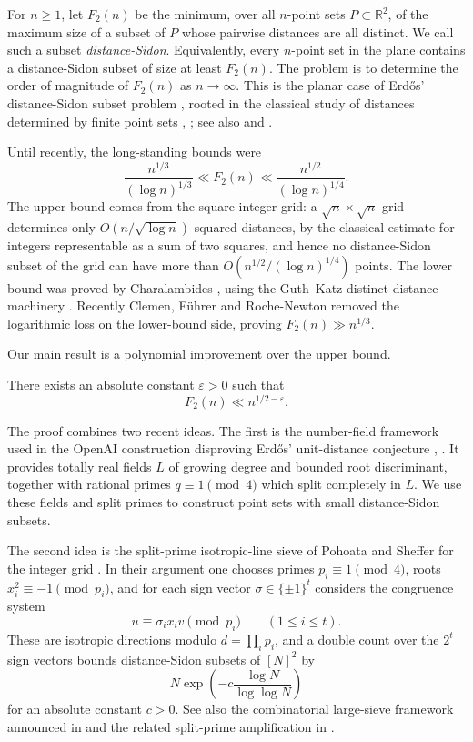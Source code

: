 For \(n\ge1\), let \(F_2(n)\) be the minimum, over all \(n\)-point sets \(P\subset\mathbb R^2\), of the maximum size of a subset of \(P\) whose pairwise distances are all distinct.
We call such a subset \emph{distance-Sidon}.
Equivalently, every \(n\)-point set in the plane contains a distance-Sidon subset of size at least \(F_2(n)\).
The problem is to determine the order of magnitude of \(F_2(n)\) as \(n\to\infty\).
This is the planar case of Erd\H{o}s' distance-Sidon subset problem \cite{Bloom26}, rooted in the classical study of distances determined by finite point sets \cite{Erdos46}, \cite{ErGu70}; see also \cite{LeTh95} and \cite{CFGHUZ15}.

Until recently, the long-standing bounds were
\[
\frac{n^{1/3}}{(\log n)^{1/3}}
\ll F_2(n)
\ll
\frac{n^{1/2}}{(\log n)^{1/4}}.
\]
The upper bound comes from the square integer grid: a \(\sqrt n\times\sqrt n\) grid determines only \(O(n/\sqrt{\log n})\) squared distances, by the classical estimate for integers representable as a sum of two squares, and hence no distance-Sidon subset of the grid can have more than \(O(n^{1/2}/(\log n)^{1/4})\) points.
The lower bound was proved by Charalambides \cite{Ch13}, using the Guth--Katz distinct-distance machinery \cite{GuthKatz15}.
Recently Clemen, F\"uhrer and Roche-Newton \cite{CFRN26} removed the logarithmic loss on the lower-bound side, proving \(F_2(n)\gg n^{1/3}\).

Our main result is a polynomial improvement over the upper bound.

\begin{theorem}\label{thm:main}
There exists an absolute constant \(\varepsilon>0\) such that
\[
F_2(n)\ll n^{1/2-\varepsilon}.
\]
\end{theorem}

The proof combines two recent ideas.
The first is the number-field framework used in the OpenAI construction disproving Erd\H{o}s' unit-distance conjecture \cite{OpenAIUnitDistance26}, \cite{ABGLSSTWM26}.
It provides totally real fields \(L\) of growing degree and bounded root discriminant, together with rational primes \(q\equiv1\pmod4\) which split completely in \(L\).
We use these fields and split primes to construct point sets with small distance-Sidon subsets.

The second idea is the split-prime isotropic-line sieve of Pohoata and Sheffer for the integer grid \cite{PohoataShefferBlog26}.
In their argument one chooses primes \(p_i\equiv1\pmod4\), roots \(x_i^2\equiv -1\pmod {p_i}\), and for each sign vector \(\sigma\in\{\pm1\}^t\) considers the congruence system
\[
u\equiv \sigma_i x_i v\pmod {p_i}\qquad(1\le i\le t).
\]
These are isotropic directions modulo \(d=\prod_i p_i\), and a double count over the \(2^t\) sign vectors bounds distance-Sidon subsets of \([N]^2\) by
\[
N\exp\left(-c\frac{\log N}{\log\log N}\right)
\]
for an absolute constant \(c>0\).
See also the combinatorial large-sieve framework announced in \cite{CMPShY26} and the related split-prime amplification in \cite{Pohoata26SplitPrimes}.


